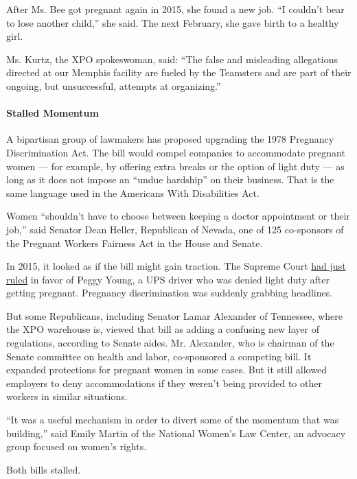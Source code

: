After Ms. Bee got pregnant again in 2015, she found a new job. ``I
couldn't bear to lose another child,'' she said. The next February, she
gave birth to a healthy girl.

Ms. Kurtz, the XPO spokeswoman, said: ``The false and misleading
allegations directed at our Memphis facility are fueled by the Teamsters
and are part of their ongoing, but unsuccessful, attempts at
organizing.''

\hypertarget{stalled-momentum}{%
\paragraph{Stalled Momentum}\label{stalled-momentum}}

A bipartisan group of lawmakers has proposed upgrading the 1978
Pregnancy Discrimination Act. The bill would compel companies to
accommodate pregnant women --- for example, by offering extra breaks or
the option of light duty --- as long as it does not impose an ``undue
hardship'' on their business. That is the same language used in the
Americans With Disabilities Act.

Women ``shouldn't have to choose between keeping a doctor appointment or
their job,'' said Senator Dean Heller, Republican of Nevada, one of 125
co-sponsors of the Pregnant Workers Fairness Act in the House and
Senate.

In 2015, it looked as if the bill might gain traction. The Supreme Court
\href{https://www.nytimes3xbfgragh.onion/2015/03/26/us/ups-workers-pregnancy-discrimination-suit-reinstated-by-supreme-court.html}{had
just ruled} in favor of Peggy Young, a UPS driver who was denied light
duty after getting pregnant. Pregnancy discrimination was suddenly
grabbing headlines.

But some Republicans, including Senator Lamar Alexander of Tennessee,
where the XPO warehouse is, viewed that bill as adding a confusing new
layer of regulations, according to Senate aides. Mr. Alexander, who is
chairman of the Senate committee on health and labor, co-sponsored a
competing bill. It expanded protections for pregnant women in some
cases. But it still allowed employers to deny accommodations if they
weren't being provided to other workers in similar situations.

``It was a useful mechanism in order to divert some of the momentum that
was building,'' said Emily Martin of the National Women's Law Center, an
advocacy group focused on women's rights.

Both bills stalled.

